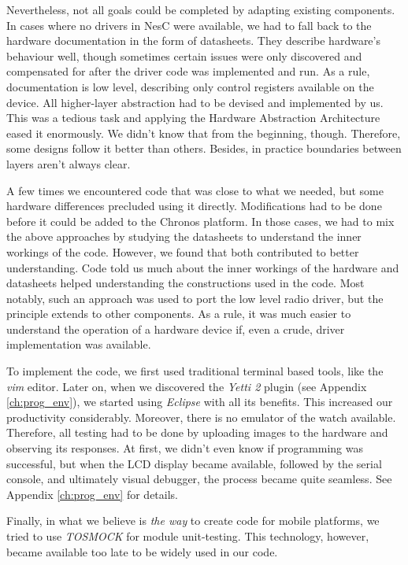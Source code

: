 Nevertheless, not all goals could be completed by adapting existing components. In cases where no drivers in NesC were available, we had to fall back to the hardware documentation in the form of datasheets. They describe hardware's behaviour well, though sometimes certain issues were only discovered and compensated for after the driver code was implemented and run. As a rule, documentation is low level, describing only control registers available on the device. All higher-layer  abstraction had to be devised and implemented by us. This was a tedious task and applying the Hardware Abstraction Architecture eased it enormously. We didn't know that from the beginning, though. Therefore, some designs follow it better than others. Besides, in practice boundaries between layers aren't always clear.

A few times we encountered code that was close to what we needed, but some hardware differences precluded using it directly. Modifications had to be done before it could be added to the Chronos platform. In those cases, we had to mix the above approaches by studying the datasheets to understand the inner workings of the code. However, we found that both contributed to better understanding. Code told us much about the inner workings of the hardware and datasheets helped understanding the constructions used in the code. Most notably, such an approach was used to port the low level radio driver, but the principle extends to other components. As a rule, it was much easier to understand the operation of a hardware device if, even a crude, driver implementation was available.

To implement the code, we first used traditional terminal based tools, like the \emph{vim} editor. Later on, when we discovered the \emph{Yetti 2} plugin (see Appendix \ref{ch:prog_env}), we started using \emph{Eclipse} with all its benefits. This increased our productivity considerably. Moreover, there is no emulator of the watch available. Therefore, all testing had to be done by uploading images to the hardware and observing its responses. At first, we didn't even know if programming was successful, but when the LCD display became available, followed by the serial console, and ultimately visual debugger, the process became quite seamless. See Appendix \ref{ch:prog_env} for details.

Finally, in what we believe is \emph{the way} to create code for mobile platforms, we tried to use \emph{TOSMOCK} for module unit-testing. This technology, however, became available too late to be widely used in our code.

